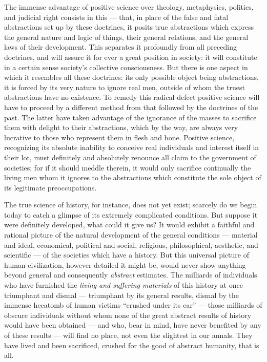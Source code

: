 \documentclass[12pt]{report}
\begin{document}
The immense advantage of positive science over theology, metaphysics, politics, and judicial right consists in this — that, in place of the false and fatal abstractions set up by these doctrines, it posits true abstractions which express the general nature and logic of things, their general relations, and the general laws of their development. This separates it profoundly from all preceding doctrines, and will assure it for ever a great position in society: it will constitute in a certain sense society’s collective consciousness. But there is one aspect in which it resembles all these doctrines: its only possible object being abstractions, it is forced by its very nature to ignore real men, outside of whom the truest abstractions have no existence. To remedy this radical defect positive science will have to proceed by a different method from that followed by the doctrines of the past. The latter have taken advantage of the ignorance of the masses to sacrifice them with delight to their abstractions, which by the way, are always very lucrative to those who represent them in flesh and bone. Positive science, recognizing its absolute inability to conceive real individuals and interest itself in their lot, must definitely and absolutely renounce all claim to the government of societies; for if it should meddle therein, it would only sacrifice continually the living men whom it ignores to the abstractions which constitute the sole object of its legitimate preoccupations.


The true science of history, for instance, does not yet exist; scarcely do we begin today to catch a glimpse of its extremely complicated conditions. But suppose it were definitely developed, what could it give us? It would exhibit a faithful and rational picture of the natural development of the general conditions — material and ideal, economical, political and social, religious, philosophical, aesthetic, and scientific — of the societies which have a history. But this universal picture of human civilization, however detailed it might be, would never show anything beyond general and consequently \emph{abstract} estimates. The milliards of individuals who have furnished the \emph{living and suffering materials} of this history at once triumphant and dismal — triumphant by its general results, dismal by the immense hecatomb of human victims “crushed under its car” — those milliards of obscure individuals without whom none of the great abstract results of history would have been obtained — and who, bear in mind, have never benefited by any of these results — will find no place, not even the slightest in our annals. They have lived and been sacrificed, crushed for the good of abstract humanity, that is all.
\end{document}

